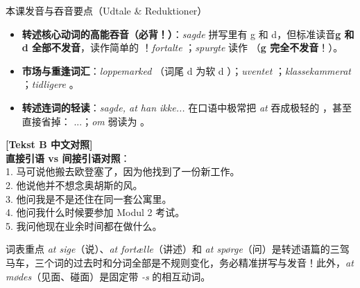 \begin{tipbox}{本课发音与吞音要点（Udtale \& Reduktioner）}
\begin{itemize}
  \item \textbf{转述核心动词的高能吞音（必背！）}：\textit{sagde} 拼写里有 g 和 d，但标准读音\textbf{g 和 d 全部不发音}，读作简单的 ！\textit{fortalte} ；\textit{spurgte} 读作 （\textbf{g 完全不发音}！）。
  \item \textbf{市场与重逢词汇}：\textit{loppemarked} （词尾 d 为软 d ）；\textit{uventet} ；\textit{klassekammerat} ；\textit{tidligere} 。
  \item \textbf{转述连词的轻读}：\textit{sagde, at han ikke...} 在口语中极常把 \textit{at} 吞成极轻的 ，甚至直接省掉： ...；\textit{om} 弱读为 。
\end{itemize}
\end{tipbox}

\begin{transbox}
\small
\textbf{\color{NCDTeal}[Tekst B 中文对照]}\\
\textbf{直接引语 vs 间接引语对照}：\\
1. 马可说他搬去欧登塞了，因为他找到了一份新工作。\\
2. 他说他并不想念奥胡斯的风。\\
3. 他问我是不是还住在同一套公寓里。\\
4. 他问我什么时候要参加 Modul 2 考试。\\
5. 我问他现在业余时间都在做什么。
\end{transbox}


\begin{tipbox}{词表重点}
\textit{at sige}（说）、\textit{at fortælle}（讲述）和 \textit{at spørge}（问）是转述语篇的三驾马车，三个词的过去时和分词全部是不规则变化，务必精准拼写与发音！此外，\textit{at mødes}（见面、碰面）是固定带 \textit{-s} 的相互动词。
\end{tipbox}

